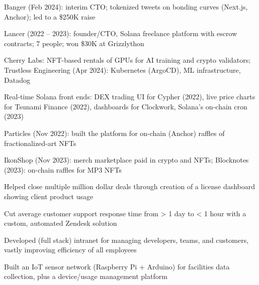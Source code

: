 \documentclass[print]{jack-resume}
\begin{document}
\begin{tightemize}
    \item Banger (Feb 2024): interim CTO; tokenized tweets on bonding curves (Next.js, Anchor); led to a \$250K raise
    \item Lancer (2022 – 2023): founder/CTO, Solana freelance platform with escrow contracts; 7 people; won \$30K at Grizzlython
    \item Cherry Labs: NFT-based rentals of GPUs for AI training and crypto validators; Trustless Engineering (Apr 2024): Kubernetes (ArgoCD), ML infrastructure, Datadog
    \item Real-time Solana front ends: DEX trading UI for Cypher (2022), live price charts for Tsunami Finance (2022), dashboards for Clockwork, Solana's on-chain cron (2023)
    \item Particles (Nov 2022): built the platform for on-chain (Anchor) raffles of fractionalized-art NFTs
    \item IkonShop (Nov 2023): merch marketplace paid in crypto and NFTs; Blocknotes (2023): on-chain raffles for MP3 NFTs
\end{tightemize}
\sectionsep

\begin{tightemize}
    \item Helped close multiple million dollar deals through creation of a license dashboard showing client product usage
    \item Cut average customer support response time from > 1 day to < 1 hour with a custom, automated Zendesk solution
    \item Developed (full stack) intranet for managing developers, teams, and customers, vastly improving efficiency of all employees
\end{tightemize}
\sectionsep

\begin{tightemize}
    \item Built an IoT sensor network (Raspberry Pi + Arduino) for facilities data collection, plus a device/usage management platform
\end{tightemize}
\end{document}
